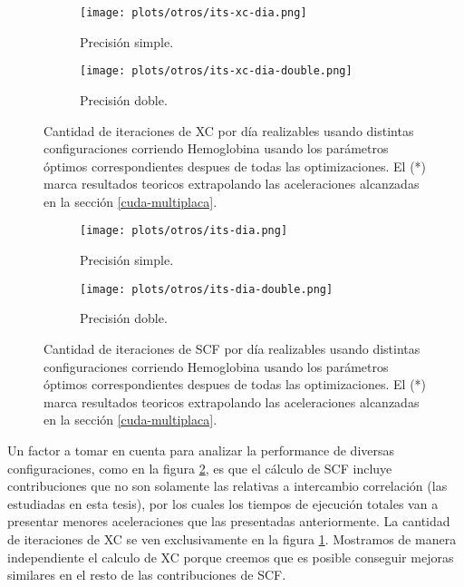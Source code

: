 \begin{figure}[htbp]
\centering
  \begin{subfigure}[b]{\plotwidthtres}
    \texttt{[image: plots/otros/its-xc-dia.png]}
    \caption{Precisi\'on simple.}
  \end{subfigure}
  \begin{subfigure}[b]{\plotwidthtres}
    \texttt{[image: plots/otros/its-xc-dia-double.png]}
    \caption{Precisi\'on doble.}
  \end{subfigure}
  \caption{Cantidad de iteraciones de XC por d\'ia realizables usando distintas configuraciones corriendo Hemoglobina usando los
            par\'ametros \'optimos correspondientes despues de todas las optimizaciones. El (*) marca resultados teoricos extrapolando
            las aceleraciones alcanzadas en la secci\'on \ref{cuda-multiplaca}.}
  \label{fig:its-xc-dia}
\end{figure}


\begin{figure}[htbp]
\centering
  \begin{subfigure}[b]{\plotwidthtres}
    \texttt{[image: plots/otros/its-dia.png]}
    \caption{Precisi\'on simple.}
  \end{subfigure}
  \begin{subfigure}[b]{\plotwidthtres}
    \texttt{[image: plots/otros/its-dia-double.png]}
    \caption{Precisi\'on doble.}
  \end{subfigure}
    \caption{Cantidad de iteraciones de SCF por d\'ia realizables usando distintas configuraciones corriendo Hemoglobina usando los
              par\'ametros \'optimos correspondientes despues de todas las optimizaciones. El (*) marca resultados teoricos extrapolando
              las aceleraciones alcanzadas en la secci\'on \ref{cuda-multiplaca}.}
    \label{fig:its-dia}
\end{figure}

Un factor a tomar en cuenta para analizar la performance de diversas configuraciones, como en la figura \ref{fig:its-dia},
es que el c\'alculo de SCF incluye contribuciones que no son solamente las relativas a intercambio correlaci\'on
(las estudiadas en esta tesis), por los cuales los tiempos de ejecuci\'on totales van
a presentar menores aceleraciones que las presentadas anteriormente. La cantidad de iteraciones de XC se ven
exclusivamente en la figura \ref{fig:its-xc-dia}. Mostramos de manera independiente el calculo de XC porque
creemos que es posible conseguir mejoras similares en el resto de las contribuciones de SCF.

